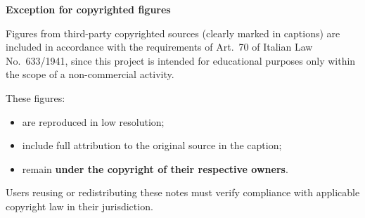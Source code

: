 {    \vspace{0.6cm}
    {\large\textbf{Exception for copyrighted figures}}

    Figures from third-party copyrighted sources (clearly marked in captions) are included in accordance with the requirements of Art.\!~70 of Italian Law No.\!~633/1941, since this project is intended for educational purposes only within the scope of a non-commercial activity.

    These figures:
    \begin{itemize}[parsep=0pt]
        \item are reproduced in low resolution;
        \item include full attribution to the original source in the caption;
        \item remain \textbf{under the copyright of their respective owners}.
    \end{itemize}

    Users reusing or redistributing these notes must verify compliance with applicable copyright law in their jurisdiction.
}
